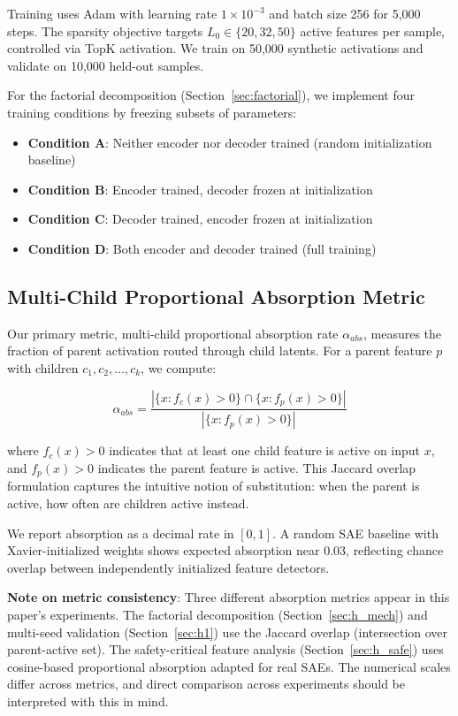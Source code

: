 \documentclass{article}
\begin{document}
Training uses Adam with learning rate $1 \times 10^{-3}$ and batch size 256 for 5,000 steps. The sparsity objective targets $L_0 \in \{20, 32, 50\}$ active features per sample, controlled via TopK activation. We train on 50,000 synthetic activations and validate on 10,000 held-out samples.

For the factorial decomposition (Section~\ref{sec:factorial}), we implement four training conditions by freezing subsets of parameters:
\begin{itemize}
\item \textbf{Condition A}: Neither encoder nor decoder trained (random initialization baseline)
\item \textbf{Condition B}: Encoder trained, decoder frozen at initialization
\item \textbf{Condition C}: Decoder trained, encoder frozen at initialization
\item \textbf{Condition D}: Both encoder and decoder trained (full training)
\end{itemize}

\subsection{Multi-Child Proportional Absorption Metric}

Our primary metric, multi-child proportional absorption rate $\alpha_{abs}$, measures the fraction of parent activation routed through child latents. For a parent feature $p$ with children $c_1, c_2, \dots, c_k$, we compute:

\begin{equation}
\alpha_{abs} = \frac{|\{x : f_c(x) > 0\} \cap \{x : f_p(x) > 0\}|}{|\{x : f_p(x) > 0\}|}
\end{equation}

where $f_c(x) > 0$ indicates that at least one child feature is active on input $x$, and $f_p(x) > 0$ indicates the parent feature is active. This Jaccard overlap formulation captures the intuitive notion of substitution: when the parent is active, how often are children active instead.

We report absorption as a decimal rate in $[0, 1]$. A random SAE baseline with Xavier-initialized weights shows expected absorption near 0.03, reflecting chance overlap between independently initialized feature detectors.

\textbf{Note on metric consistency}: Three different absorption metrics appear in this paper's experiments. The factorial decomposition (Section~\ref{sec:h_mech}) and multi-seed validation (Section~\ref{sec:h1}) use the Jaccard overlap (intersection over parent-active set). The safety-critical feature analysis (Section~\ref{sec:h_safe}) uses cosine-based proportional absorption adapted for real SAEs. The numerical scales differ across metrics, and direct comparison across experiments should be interpreted with this in mind.
\end{document}
